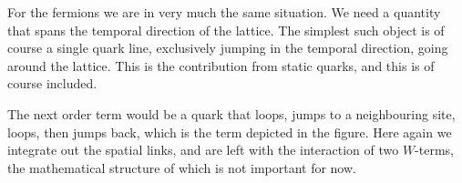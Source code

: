 \documentclass[12pt,a4paper,dvipsnames,usenames,handout]{beamer}
\begin{document}
\begin{frame}

  {
    For the fermions we are in very much the same situation. We need a quantity that spans the temporal direction of the lattice.
    The simplest such object is of course a single quark line, exclusively jumping in the temporal direction, going around the
    lattice. This is the contribution from static quarks, and this is of course included.

    The next order term would be a quark that loops, jumps to a neighbouring site, loops, then jumps back, which is the term
    depicted in the figure. Here again we integrate out the spatial links, and are left with the interaction of two $W$-terms, the
    mathematical structure of which is not important for now.
  }

\end{frame}
\end{document}
